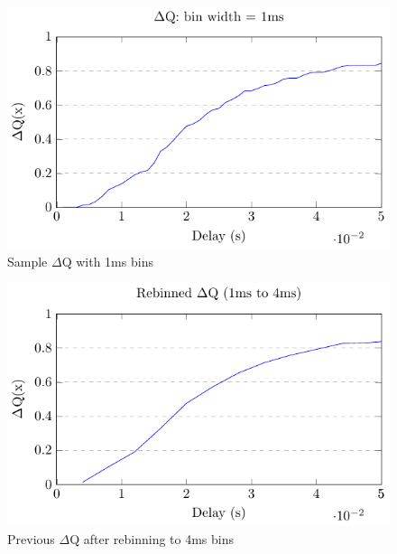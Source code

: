         
        \begin{figure}[H]
            \begin{center}
                \includegraphics[scale=1.2]{tikz/cdf.pdf}
            \end{center}
            \caption{Sample $\Delta$Q with 1ms bins}
        \end{figure}

 
        \begin{figure}[H]
            \begin{center}
                \includegraphics[scale=1.2]{tikz/rebinned_cdf.pdf}
            \end{center}
            \caption{Previous $\Delta$Q after rebinning to 4ms bins}
        \end{figure}
